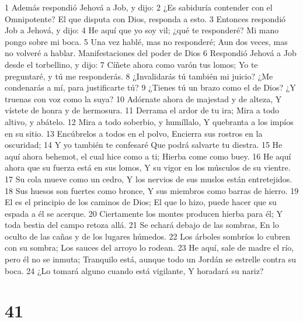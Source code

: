 1 Además respondió Jehová a Job, y dijo:  
2 ¿Es sabiduría contender con el Omnipotente? 
El que disputa con Dios, responda a esto.  
3 Entonces respondió Job a Jehová, y dijo:  
4 He aquí que yo soy vil; ¿qué te responderé? 
Mi mano pongo sobre mi boca. 
5 Una vez hablé, mas no responderé; Aun dos veces, mas no volveré a hablar.  
Manifestaciones del poder de Dios 
6 Respondió Jehová a Job desde el torbellino, y dijo:  
7 Cíñete ahora como varón tus lomos;  
Yo te preguntaré, y tú me responderás.  
8 ¿Invalidarás tú también mi juicio?  
¿Me condenarás a mí, para justificarte tú?  
9 ¿Tienes tú un brazo como el de Dios?  
¿Y truenas con voz como la suya?  
10 Adórnate ahora de majestad y de alteza,  
Y vístete de honra y de hermosura.  
11 Derrama el ardor de tu ira;  
Mira a todo altivo, y abátelo.  
12 Mira a todo soberbio, y humíllalo,  
Y quebranta a los impíos en su sitio.  
13 Encúbrelos a todos en el polvo,  
Encierra sus rostros en la oscuridad;  
14 Y yo también te confesaré  
Que podrá salvarte tu diestra.  
15 He aquí ahora behemot, el cual hice como a ti;  
Hierba come como buey.  
16 He aquí ahora que su fuerza está en sus lomos,  
Y su vigor en los músculos de su vientre.  
17 Su cola mueve como un cedro,  
Y los nervios de sus muslos están entretejidos.  
18 Sus huesos son fuertes como bronce,  
Y sus miembros como barras de hierro. 
19 El es el principio de los caminos de Dios;  
El que lo hizo, puede hacer que su espada a él se acerque. 
20 Ciertamente los montes producen hierba para él;  
Y toda bestia del campo retoza allá.  
21 Se echará debajo de las sombras,  
En lo oculto de las cañas y de los lugares húmedos.  
22 Los árboles sombríos lo cubren con su sombra;  
Los sauces del arroyo lo rodean. 
23 He aquí, sale de madre el río, pero él no se inmuta;  
Tranquilo está, aunque todo un Jordán se estrelle contra su boca. 
24 ¿Lo tomará alguno cuando está vigilante,  
Y horadará su nariz?  

\chapter{41}

